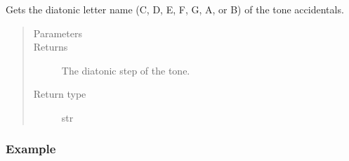 \documentclass[letterpaper,10pt,english]{sphinxmanual}
\begin{document}
\begin{fulllineitems}
\begin{fulllineitems}
\begin{sphinxVerbatim}[commandchars=\\\{\}]
   
\end{sphinxVerbatim}

\end{fulllineitems}


\begin{fulllineitems}
\label{\detokenize{api:main.Tone.get_step}}
Gets the diatonic letter name (C, D, E, F, G, A, or B) of the tone  accidentals.
\begin{quote}\begin{description}
\item[{Parameters}] \leavevmode
{} \textendash{} 

\item[{Returns}] \leavevmode
The diatonic step of the tone.

\item[{Return type}] \leavevmode
str

\end{description}\end{quote}
\subsubsection*{Example}

\begin{sphinxVerbatim}[commandchars=\\\{\}]
   
\end{sphinxVerbatim}

\end{fulllineitems}


\end{fulllineitems}
\end{document}
